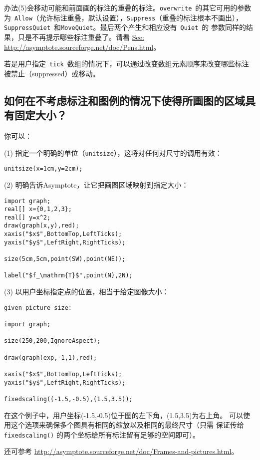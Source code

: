 办法(5)会移动可能和前面画的标注的重叠的标注。\verb|overwrite|~的其它可用的参数
为~\verb|Allow|（允许标注重叠，默认设置），\verb|Suppress|（重叠的标注根本不画出），
\verb|SuppressQuiet|~和\verb|MoveQuiet|。最后两个产生和相应没有~\verb|Quiet|~的
参数同样的结果，只是不再提示哪些标注重叠了。请看
\url{See:  http://asymptote.sourceforge.net/doc/Pens.html}。

若是用户指定~\verb|tick|~数组的情况下，可以通过改变数组元素顺序来改变哪些标注
被禁止（suppressed）或移动。

\subsection{\label{Q6.8}如何在不考虑标注和图例的情况下使得所画图的区域具有固定大小？}
你可以：

(1) 指定一个明确的单位（\verb|unitsize|），这将对任何对尺寸的调用有效：
\begin{lstlisting}
unitsize(x=1cm,y=2cm);
\end{lstlisting}

(2) 明确告诉Asymptote，让它把画图区域映射到指定大小：
\begin{lstlisting}
import graph;
real[] x={0,1,2,3};
real[] y=x^2;
draw(graph(x,y),red);
xaxis("$x$",BottomTop,LeftTicks);
yaxis("$y$",LeftRight,RightTicks);

size(5cm,5cm,point(SW),point(NE));

label("$f_\mathrm{T}$",point(N),2N);
\end{lstlisting}

(3) 以用户坐标指定点的位置，相当于给定图像大小：
\begin{lstlisting}
given picture size:

import graph;

size(250,200,IgnoreAspect);

draw(graph(exp,-1,1),red);

xaxis("$x$",BottomTop,LeftTicks);
yaxis("$y$",LeftRight,RightTicks);

fixedscaling((-1.5,-0.5),(1.5,3.5));
\end{lstlisting}

在这个例子中，用户坐标(-1.5,-0.5)位于图的左下角，(1.5,3.5)为右上角。
可以使用这个选项来确保多个图具有相同的缩放以及相同的最终尺寸（只需
保证传给 \verb|fixedscaling()| 的两个坐标给所有标注留有足够的空间即可）。

还可参考 \url{http://asymptote.sourceforge.net/doc/Frames-and-pictures.html}。

